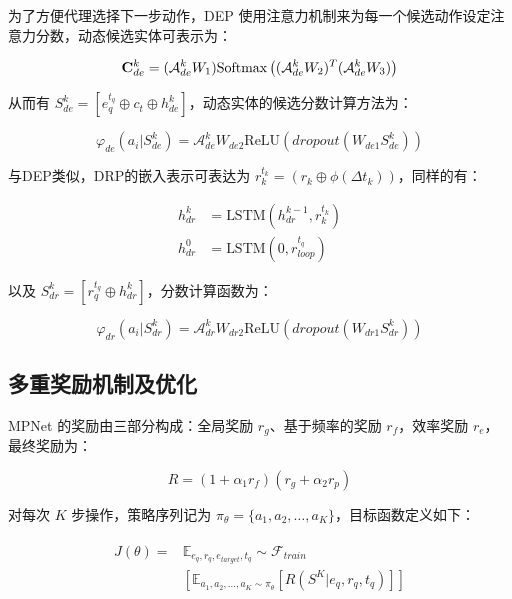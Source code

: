 \documentclass[a4paper, AutoFakeBold]{article}
\begin{document}
为了方便代理选择下一步动作，DEP 使用注意力机制来为每一个候选动作设定注意力分数，动态候选实体可表示为：

\begin{equation}
{\bold C}^k_{de}=({\mathcal A}^k_{de}W_1)\text{Softmax}\left(({\mathcal A}^k_{de}W_2)^T({\mathcal A}^k_{de}W_3)\right)
\end{equation}

从而有 $S_{de}^k=[e_q^{t_q}\oplus c_t \oplus h^k_{de}]$，动态实体的候选分数计算方法为：

\begin{equation}
\varphi_{de}(a_i|S^k_{de})={\mathcal A}_{de}^k W_{de2}\text{ReLU}(dropout(W_{de1}S^k_{de}))
\end{equation}

与DEP类似，DRP的嵌入表示可表达为 $r_k^{t_k}=(r_k\oplus\phi(\Delta t_k))$，同样的有：

\begin{equation}
	\begin{aligned}
h^k_{dr} & =\text{LSTM}(h_{dr}^{k-1},r_k^{t_k}) \\ 
h^0_{dr} & =\text{LSTM}(0,r_{loop}^{t_q})
	\end{aligned}
\end{equation}

以及 $S_{dr}^k=[r_q^{t_q}\oplus h^k_{dr}]$，分数计算函数为：

\begin{equation}
\varphi_{dr}(a_i|S^k_{dr})={\mathcal A}_{dr}^k W_{dr2}\text{ReLU}(dropout(W_{dr1}S^k_{dr}))
\end{equation}


\subsection{多重奖励机制及优化}

MPNet 的奖励由三部分构成：全局奖励 $r_g$、基于频率的奖励 $r_f$，效率奖励 $r_e$，最终奖励为：

\begin{equation}
R=(1+\alpha_1 r_f)(r_g+\alpha_2 r_p)
\end{equation}

对每次 $K$ 步操作，策略序列记为 $\pi_{\theta}=\{a_1,a_2,\dots,a_K\}$，目标函数定义如下：

\begin{equation}
\begin{aligned}
	\begin{split}
		J(\theta)= & {\mathbb E}_{e_q,r_q,e_{target},t_q}\sim{\mathcal F}_{train}\\
		& [{\mathbb E}_{a_1,a_2,\dots,a_K\sim\pi_{\theta}}[R(S^K|e_q,r_q,t_q)]]
	\end{split}
\end{aligned}
\end{equation}
\end{document}

